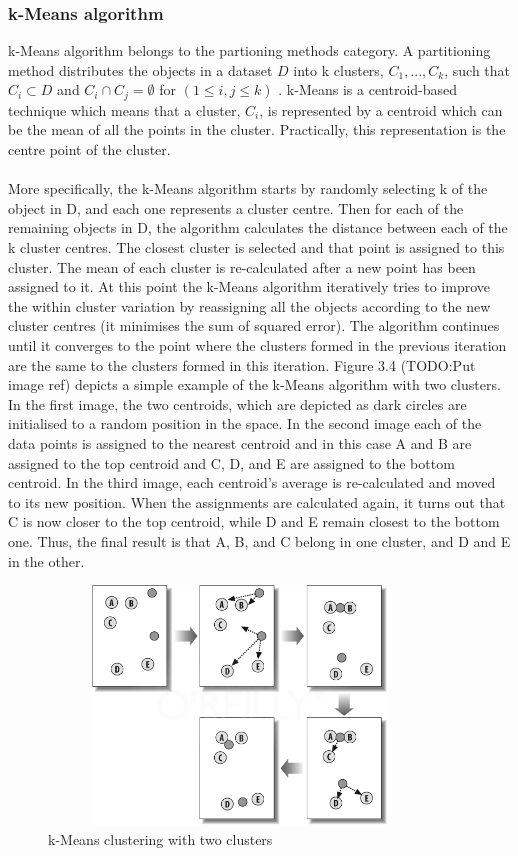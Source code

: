 \subsubsection{k-Means algorithm}
k-Means algorithm belongs to the partioning methods category. A partitioning method distributes the objects in a dataset $D$ into k clusters, $C_1, ..., C_k$, such that $C_i \subset D$ and $C_i \cap C_j = \emptyset$ for $(1 \leq i, j \leq k)$ \citep{han2005}. k-Means is a centroid-based technique which means that a cluster, $C_i$, is represented by a centroid which can be the mean of all the points in the cluster. Practically, this representation is the centre point of the cluster. \\\\
More specifically, the k-Means algorithm starts by randomly selecting k of the object in D, and each one represents a cluster centre. Then for each of the remaining objects in D, the algorithm calculates the distance between each of the k cluster centres. The closest cluster is selected and that point is assigned to this cluster. The mean of each cluster is re-calculated after a new point has been assigned to it. At this point the k-Means algorithm iteratively tries to improve the within cluster variation by reassigning all the objects according to the new cluster centres  (it minimises the sum of squared error). The algorithm continues until it converges to the point where the clusters formed in the previous iteration are the same to the clusters formed in this iteration. Figure 3.4 (TODO:Put image ref) depicts a simple example of the k-Means algorithm with two clusters. In the first image, the two centroids, which are depicted as dark circles are initialised to a random position in the space. In the second image each of the data points is assigned to the nearest centroid and in this case A and B are assigned to the top centroid and C, D, and E are assigned to the bottom centroid. In the third image, each centroid's average is re-calculated and moved to its new position. When the assignments are calculated again, it turns out that C is now closer to the top centroid, while D and E remain closest to the bottom one. Thus, the final result is that A, B, and C belong in one cluster, and D and E in the other.
\begin{figure}[!htbp]
  \begin{center}
    \includegraphics[height=2.5in, width=4in]{kmeans-example}
    \caption{k-Means clustering with two clusters}
    \label{kMeansExample}
  \end{center}
\end{figure} 
